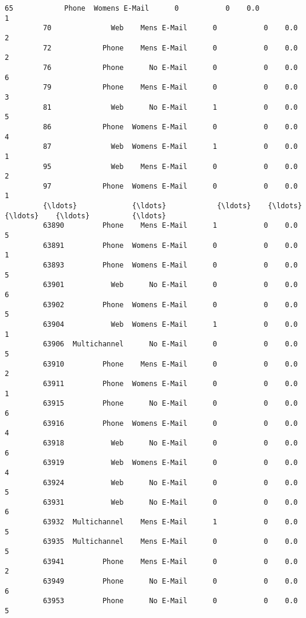 \documentclass[11pt]{article}
\begin{document}
\begin{Verbatim}[commandchars=\\\{\}]
         65            Phone  Womens E-Mail      0           0    0.0            1  
         70              Web    Mens E-Mail      0           0    0.0            2  
         72            Phone    Mens E-Mail      0           0    0.0            2  
         76            Phone      No E-Mail      0           0    0.0            6  
         79            Phone    Mens E-Mail      0           0    0.0            3  
         81              Web      No E-Mail      1           0    0.0            5  
         86            Phone  Womens E-Mail      0           0    0.0            4  
         87              Web  Womens E-Mail      1           0    0.0            1  
         95              Web    Mens E-Mail      0           0    0.0            2  
         97            Phone  Womens E-Mail      0           0    0.0            1  
         {\ldots}             {\ldots}            {\ldots}    {\ldots}         {\ldots}    {\ldots}          {\ldots}  
         63890         Phone    Mens E-Mail      1           0    0.0            5  
         63891         Phone  Womens E-Mail      0           0    0.0            1  
         63893         Phone  Womens E-Mail      0           0    0.0            5  
         63901           Web      No E-Mail      0           0    0.0            6  
         63902         Phone  Womens E-Mail      0           0    0.0            5  
         63904           Web  Womens E-Mail      1           0    0.0            1  
         63906  Multichannel      No E-Mail      0           0    0.0            5  
         63910         Phone    Mens E-Mail      0           0    0.0            2  
         63911         Phone  Womens E-Mail      0           0    0.0            1  
         63915         Phone      No E-Mail      0           0    0.0            6  
         63916         Phone  Womens E-Mail      0           0    0.0            4  
         63918           Web      No E-Mail      0           0    0.0            6  
         63919           Web  Womens E-Mail      0           0    0.0            4  
         63924           Web      No E-Mail      0           0    0.0            5  
         63931           Web      No E-Mail      0           0    0.0            6  
         63932  Multichannel    Mens E-Mail      1           0    0.0            5  
         63935  Multichannel    Mens E-Mail      0           0    0.0            5  
         63941         Phone    Mens E-Mail      0           0    0.0            2  
         63949         Phone      No E-Mail      0           0    0.0            6  
         63953         Phone      No E-Mail      0           0    0.0            5  

\end{Verbatim}
\end{document}
